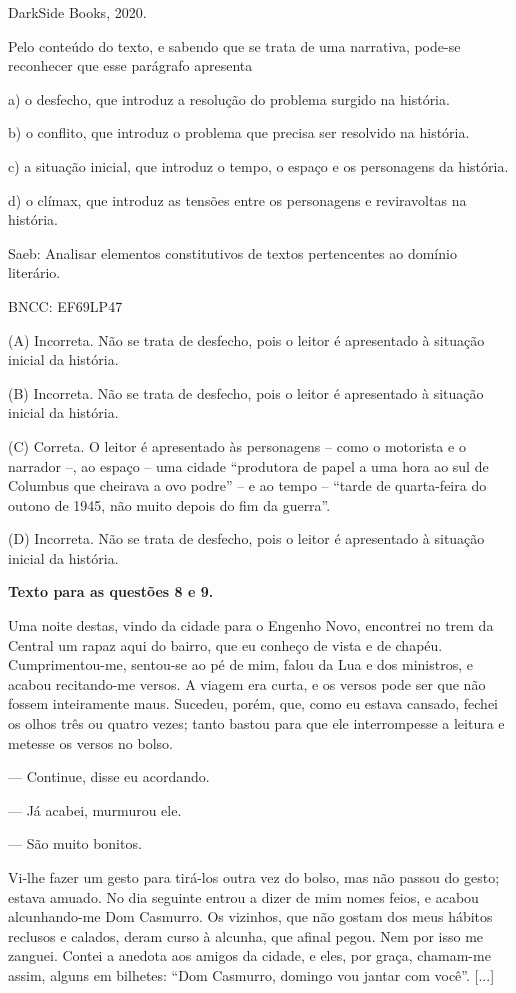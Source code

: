 DarkSide Books, 2020.

Pelo conteúdo do texto, e sabendo que se trata de uma narrativa, pode-se
reconhecer que esse parágrafo apresenta

a) o desfecho, que introduz a resolução do problema surgido na história.

b) o conflito, que introduz o problema que precisa ser resolvido na
história.

c) a situação inicial, que introduz o tempo, o espaço e os personagens
da história.

d) o clímax, que introduz as tensões entre os personagens e reviravoltas
na história.

Saeb: Analisar elementos constitutivos de textos pertencentes ao domínio
literário.

BNCC: EF69LP47

(A) Incorreta. Não se trata de desfecho, pois o leitor é apresentado à
situação inicial da história.

(B) Incorreta. Não se trata de desfecho, pois o leitor é apresentado à
situação inicial da história.

(C) Correta. O leitor é apresentado às personagens -- como o motorista e
o narrador --, ao espaço -- uma cidade ``produtora de papel a uma hora
ao sul de Columbus que cheirava a ovo podre'' -- e ao tempo -- ``tarde
de quarta-feira do outono de 1945, não muito depois do fim da guerra''.

(D) Incorreta. Não se trata de desfecho, pois o leitor é apresentado à
situação inicial da história.

\textbf{Texto para as questões 8 e 9.}

Uma noite destas, vindo da cidade para o Engenho Novo, encontrei no trem
da Central um rapaz aqui do bairro, que eu conheço de vista e de chapéu.
Cumprimentou-me, sentou-se ao pé de mim, falou da Lua e dos ministros, e
acabou recitando-me versos. A viagem era curta, e os versos pode ser que
não fossem inteiramente maus. Sucedeu, porém, que, como eu estava
cansado, fechei os olhos três ou quatro vezes; tanto bastou para que ele
interrompesse a leitura e metesse os versos no bolso.

--- Continue, disse eu acordando.

--- Já acabei, murmurou ele.

--- São muito bonitos.

Vi-lhe fazer um gesto para tirá-los outra vez do bolso, mas não passou
do gesto; estava amuado. No dia seguinte entrou a dizer de mim nomes
feios, e acabou alcunhando-me Dom Casmurro. Os vizinhos, que não gostam
dos meus hábitos reclusos e calados, deram curso à alcunha, que afinal
pegou. Nem por isso me zanguei. Contei a anedota aos amigos da cidade, e
eles, por graça, chamam-me assim, alguns em bilhetes: ``Dom Casmurro,
domingo vou jantar com você''. {[}...{]}

